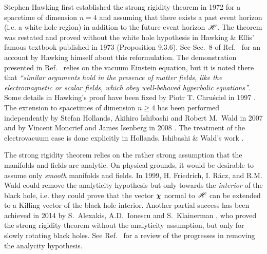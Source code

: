 \begin{hist}
Stephen Hawking first established the strong rigidity
theorem in 1972 \cite{Hawki72}
for a spacetime of dimension $n=4$ and assuming that there exists
a past event horizon (i.e. a white hole region) in addition to the
future event horizon $\mathscr{H}$.
The theorem was restated and proved without the white hole hypothesis
in Hawking \& Ellis' famous textbook published in 1973 \cite{HawkiE73}
(Proposition 9.3.6). See Sec.~8 of Ref.~\cite{Hawki73} for an account by Hawking himself
about this reformulation. The demonstration presented in Ref.~\cite{HawkiE73}
relies on the vacuum Einstein equation,
but it is noted there that \emph{``similar arguments hold in the presence
of matter fields, like the electromagnetic or scalar fields, which obey
well-behaved hyperbolic equations''}.
Some details in Hawking's proof have been fixed
by Piotr T. Chru\'sciel in 1997 \cite{Chrus97}.
The extension to spacetimes of
dimension $n\geq 4$ has been performed independently by
Stefan Hollands, Akihiro Ishibashi
and Robert M.~Wald in 2007 \cite{HollaIW07}
and by Vincent Moncrief and James Isenberg
in 2008 \cite{MoncrI08}. The treatment of the electrovacuum
case is done explicitly in Hollands, Ishibashi \& Wald's work \cite{HollaIW07}.
\end{hist}

The strong rigidity theorem relies on the rather strong assumption that
the manifolds and fields are analytic.
On physical grounds,
it would be desirable to assume only \emph{smooth} manifolds and fields.
In 1999, H. Friedrich, I. Rácz,
and R.M. Wald \cite{FriedRW99} could remove the analyticity hypothesis but only
towards the \emph{interior} of the black hole, i.e. they could prove that
the vector $\bm{\chi}$ normal to $\mathscr{H}$ can be extended to a Killing vector
of the black hole interior.
Another partial success has been achieved in 2014 by
S.~Alexakis, A.D.~Ionescu and
S.~Klainerman \cite{AlexaIK14}, who proved
the strong rigidity theorem without the analyticity
assumption, but only for slowly rotating black holes.
See Ref.~\cite{IonesK15} for a review of the progresses in removing
the analycity hypothesis.


